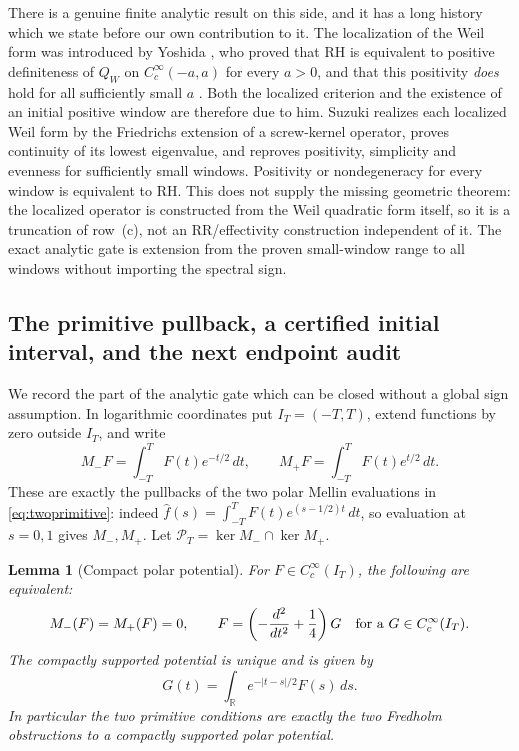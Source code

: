 \documentclass[11pt]{amsart}
\newtheorem{lemma}[theorem]{Lemma}
\theoremstyle{definition}
\theoremstyle{remark}
\newcommand{\RH}{\mathrm{RH}}
\begin{document}
There is a genuine finite analytic result on this side, and it has a long
history which we state before our own contribution to it.  The localization
of the Weil form was introduced by Yoshida \cite{Yoshida1992}, who proved
that $\RH$ is equivalent to positive definiteness of $Q_W$ on
$C_c^\infty(-a,a)$ for every $a>0$, and that this positivity \emph{does}
hold for all sufficiently small $a$ \cite[Lemma~2]{Yoshida1992}.  Both the
localized criterion and the existence of an initial positive window are
therefore due to him.  Suzuki
\cite[Theorems~1.1--1.4]{SuzukiScrew} realizes each localized Weil form by
the Friedrichs extension of a screw-kernel operator, proves continuity of
its lowest eigenvalue, and reproves positivity, simplicity and evenness for
sufficiently small windows.  Positivity or nondegeneracy for every window is
equivalent to $\RH$.  This does not supply the missing geometric theorem:
the localized operator is constructed from the Weil quadratic form itself,
so it is a truncation of row~(c), not an RR/effectivity construction
independent of it.  The exact analytic gate is extension from the proven
small-window range to all windows without importing the spectral sign.


\subsection{The primitive pullback, a certified initial interval, and the next endpoint audit}
\label{subsec:primitiveendpoints}

We record the part of the analytic gate which can be closed without a
global sign assumption.  In logarithmic coordinates put
\(I_T=(-T,T)\), extend functions by zero outside \(I_T\), and write
\[
 M_-F=\int_{-T}^{T}F(t)e^{-t/2}\,dt,
 \qquad
 M_+F=\int_{-T}^{T}F(t)e^{t/2}\,dt .
\]
These are exactly the pullbacks of the two polar Mellin evaluations in
\eqref{eq:twoprimitive}: indeed
\(\widehat f(s)=\int_{-T}^TF(t)e^{(s-1/2)t}\,dt\), so evaluation at
\(s=0,1\) gives \(M_-,M_+\).  Let
\(\mathcal P_T=\ker M_-\cap\ker M_+\).

\begin{lemma}[Compact polar potential]\label{lem:compactpolarpotential}
For \(F\in C_c^\infty(I_T)\), the following are equivalent:
\[
 M_-(F)=M_+(F)=0,
 \qquad
 F=\left(-\frac{d^2}{dt^2}+\frac14\right)G
 \quad\hbox{for a }G\in C_c^\infty(I_T).
\]
The compactly supported potential is unique and is given by
\begin{equation}\label{eq:compactpolarpotential}
 G(t)=\int_{\mathbb R}e^{-|t-s|/2}F(s)\,ds.
\end{equation}
In particular the two primitive conditions are exactly the two Fredholm
obstructions to a compactly supported polar potential.
\end{lemma}
\end{document}
